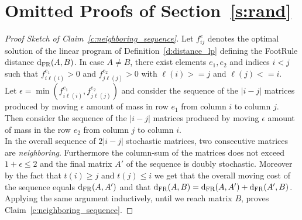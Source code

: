 \section{Omitted Proofs of Section~\ref{s:rand}}\label{rand_appendix}
\begin{proof}[Proof Sketch of Claim~\ref{c:neighboring_sequence}]
Let $f_{ij}^e$ denotes the optimal solution of the linear program of Definition~\ref{d:distance_lp} defining the FootRule distance $\mathrm{d}_{\mathrm{FR}}(A,B)$.  
In case $A\neq B$, there exist elements $e_1 , e_2$ and indices $i<j$ such that $f_{i\ell(i)}^{e_1} > 0$ and $f_{j\ell(j)}^{e_2} > 0$ with $\ell(i) >= j$ and $\ell(j) <=i$.\\

\noindent Let $\epsilon = \min(f_{i\ell(i)}^{e_1}, f_{j\ell(j)}^{e_2})$ and consider the sequence of the $|i-j|$ matrices produced by moving $\epsilon$ amount of mass in row $e_1$ from column $i$ to column $j$. Then consider the sequence of the $|i-j|$ matrices produced by moving $\epsilon$ amount of mass in the row $e_2$ from column $j$ to column $i$.\\

\noindent In the overall sequence of $2|i-j|$ stochastic matrices, two consecutive matrices are \textit{neighboring}. Furthermore the column-sum of the matrices does not exceed $1 + \epsilon \leq 2$ and the final matrix $A'$ of the sequence is doubly stochastic. Moreover by the fact that $t(i) \geq j$ and $t(j) \leq i$ we get that the overall moving cost of the sequence equals $\mathrm{d}_{\mathrm{FR}}(A,A')$ and that 
$\mathrm{d}_{\mathrm{FR}}(A,B) = \mathrm{d}_{\mathrm{FR}}(A,A') + \mathrm{d}_{\mathrm{FR}}(A',B)$. Applying the same argument inductively, until we reach matrix $B$, proves Claim~\ref{c:neighboring_sequence}.
\end{proof}

